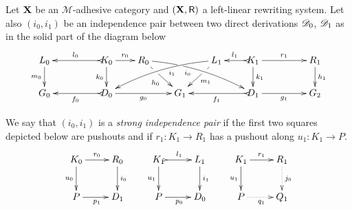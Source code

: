 \begin{definition}
	\label{def:strong}
	Let $\textbf {\textup{X}}$ be an $\mathcal{M}$-adhesive category 
	and $(\textbf {\textup{X}}, \mathsf{R})$ a left-linear rewriting system. 
	Let also $(i_0, i_1)$ be an independence pair between two direct
	derivations $\mathscr{D}_0$, $\mathscr{D}_1$
	as in the solid part of the diagram below
	\[\xymatrix@R=20pt@C=20pt{L_0 \ar[d]_{m_0}&& K_0
	\ar[d]_{k_0}\ar@{>->}[ll]_{l_0} \ar[r]^{r_0} & R_0
	\ar@/^.25cm/[drrr]|(.32)\hole_(.4){i_0}
	\ar[dr]|(.33)\hole_{h_0} && L_1 \ar@/_.25cm/[dlll]^(.4){i_1}
	\ar[dl]|(.33)\hole^{m_1}& K_1 \ar[d]^{k_1}\ar@{>->}[l]_{l_1}
	\ar[rr]^{r_1} && R_1 \ar[d]^{h_1}\\G_0 && \ar@{>->}[ll]^{f_0}
	D_0 \ar[rr]_{g_0}&& G_1 && \ar@{>->}[ll]^{f_1} D_1
	\ar[rr]_{g_1}&& G_2}
\]
	
	We say that $(i_0, i_1)$ is a \emph{strong independence pair} if
	the first two squares depicted  
	below are pushouts and if $r_1 : K_1 \to R_1$  has a pushout along $u_1 : K_1 \to P$.
	\[
	\xymatrix{
		K_0 \ar[r]^{r_0} \ar[d]_{u_0}& R_0 \ar[d]^{i_0} & K_1
		\ar@{>->}[r]^{l_1} \ar[d]_{u_1}& L_1 \ar[d]^{i_1}
		&K_1 \ar[r]^{r_1} \ar[d]_{u_1}& R_1\ar@{.>}[d]^{j_0}
		\\
		P \ar[r]_{p_1} & D_1 &P \ar[r]_{p_0} & D_0
		& P \ar@{.>}[r]_{q_1} & Q_1
	}
	\]
\end{definition}

